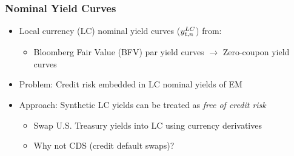 \documentclass[12pt, aspectratio=169, xcolor=dvipsnames]{beamer}  %
\begin{document}
\begin{frame}
	\frametitle{\textbf{Nominal} Yield Curves}
	\begin{itemize}
		\item Local currency (LC) nominal yield curves (\(y_{t,n} ^{LC}\)) from:
		\begin{itemize}
			\item Bloomberg Fair Value (BFV) par yield curves \(\rightarrow\) Zero-coupon yield curves
		\end{itemize}
		\item \alert{Problem:} Credit risk embedded in LC nominal yields of EM %
		\item \alert{Approach:} Synthetic LC yields can be treated as \textit{free of credit risk}
		\begin{itemize}
			\item Swap U.S. Treasury yields into LC using \alert{currency derivatives}
			\item Why not CDS (credit default swaps)?
		\end{itemize}
	\end{itemize}
\end{frame}
\end{document}
